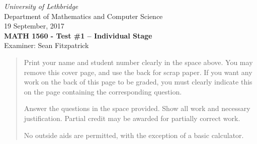 \documentclass[12pt]{article}
\newcommand{\skipline}{\vspace{12pt}}
\begin{document}
\author{Instructor: Sean Fitzpatrick}
\thispagestyle{plain}
\begin{center}
\emph{University of Lethbridge}\\
Department of Mathematics and Computer Science\\
19 September, 2017\\
{\bf MATH 1560 - Test \#1 -- Individual Stage}\\
Examiner: Sean Fitzpatrick
\end{center}



\vspace{0.1in}

\vspace*{\fill}

\begin{quote}
Print your name and student number clearly in the space above. You may remove this cover page, and use the back for scrap paper. If you want any work on the back of this page to be graded, you must clearly indicate this on the page containing the corresponding question.

\medskip

Answer the questions in the space provided. Show all work and necessary justification. Partial credit may be awarded for partially correct work.
 
\medskip

No outside aids are permitted, with the exception of a basic calculator. 
\end{quote}



\
\newpage
\end{document}
